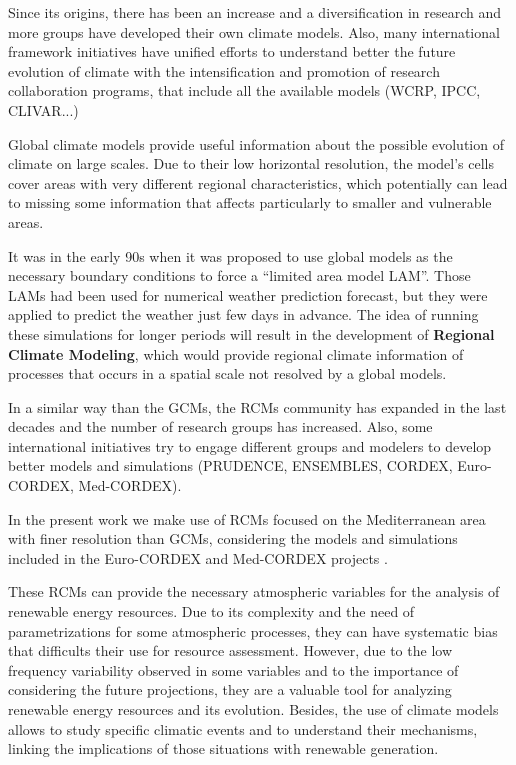 Since its origins, there has been an increase and a diversification in research and more groups have developed their own climate models. Also, many international framework initiatives have unified efforts to understand better the future evolution of climate with the intensification and promotion of research collaboration programs, that include all the available  models (WCRP, IPCC, CLIVAR...)   

Global climate models provide useful information about the possible evolution of climate on large scales. Due to their low horizontal resolution, the model's cells cover areas with very different regional characteristics, which potentially can lead to missing some information that affects particularly to smaller and vulnerable areas.

It was in the early 90s \cite*{Dickinson1989, Giorgi1990} when it was proposed to use global models as the necessary boundary conditions to force a ``limited area model LAM''. Those LAMs had been used for numerical weather prediction forecast, but they were applied to predict the weather just few days in advance. The idea of running these simulations for longer periods will result in the development of \textbf{Regional Climate Modeling}, which would provide regional climate information of processes that occurs in a spatial scale not resolved by a global models.

In a similar way than the GCMs, the RCMs community has expanded in the last decades and the number of research groups has increased. Also, some international initiatives try to engage different groups and modelers to develop better models and simulations (PRUDENCE, ENSEMBLES, CORDEX, Euro-CORDEX, Med-CORDEX).

In the present work we make use of RCMs focused on the Mediterranean area with finer resolution than GCMs, considering the models and simulations included in the Euro-CORDEX and Med-CORDEX projects \cite*{Jacob2014, Ruti2016}.

These RCMs can provide the necessary atmospheric variables for the analysis of renewable energy resources. Due to its complexity and the need of parametrizations for some atmospheric processes, they can have systematic bias that difficults their use for resource assessment. However, due to the low frequency variability observed in some variables and to the importance of considering the future projections, they are a valuable tool for analyzing renewable energy resources and its evolution. Besides, the use of climate models allows to study specific climatic events and to understand their mechanisms, linking the implications of those situations with renewable generation.


